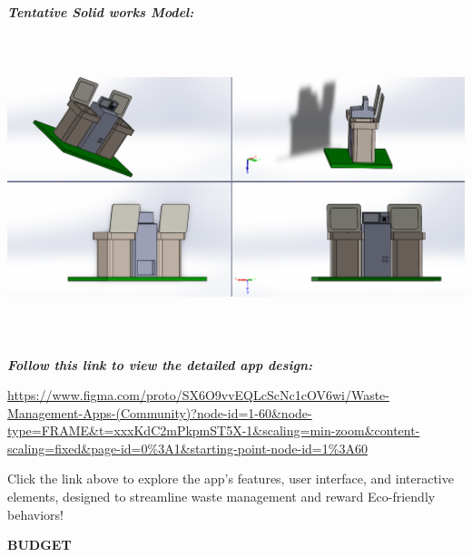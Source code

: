 \documentclass[
]{article}
\begin{document}
\emph{\textbf{Tentative Solid works Model:}}

\includegraphics[width=6.89167in,height=3.50347in]{vertopal_24f0430788374a81b8d4c0bb6e5080ec/media/image5.png}

\emph{\textbf{Follow this link to view the detailed app design:}}

\url{https://www.figma.com/proto/SX6O9vvEQLcScNc1cOV6wi/Waste-Management-Apps-(Community)?node-id=1-60\&node-type=FRAME\&t=xxxKdC2mPkpmST5X-1\&scaling=min-zoom\&content-scaling=fixed\&page-id=0\%3A1\&starting-point-node-id=1\%3A60}

Click the link above to explore the app's features, user interface, and
interactive elements, designed to streamline waste management and reward
Eco-friendly behaviors!

\textbf{BUDGET}
\end{document}
